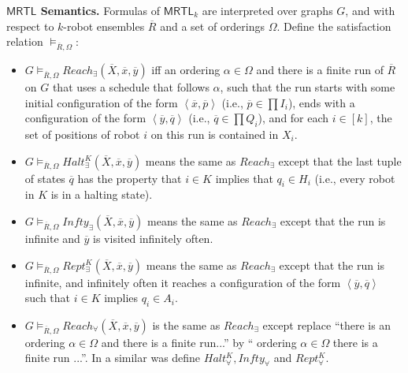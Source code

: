 \documentclass{llncs}
\def\MRTL{\textsf{MRTL}}
\newcommand{\tup}[1]{\overline{#1}}
\newcommand{\tpl}[1]{\left<{#1}\right>}
\newcommand{\sr}[1]{\footnote{{\color{red} Note. #1}}}
\renewcommand{\sr}[1]{}
\begin{document}
{\bf $\MRTL$ Semantics.} Formulas of $\MRTL_k$ are interpreted over graphs $G$, and with respect to $k$-robot ensembles $\tup{R}$ and a set of orderings $\Omega$.
Define the satisfaction relation $\models_{\tup{R},\Omega}$:
\begin{itemize}
\item $G \models_{\tup{R},\Omega} Reach_\exists(\tup{X},\tup{x},\tup{y})$ iff  an ordering $\alpha \in \Omega$ and there is a finite run of $\tup{R}$ on $G$ that uses a schedule that follows $\alpha$, such that the run starts with some initial configuration of the form $\tpl{\tup{x},\tup{p}}$ (i.e., $\tup{p} \in \prod I_i$), ends with a configuration of the form $\tpl{\tup{y},\tup{q}}$ (i.e., $\tup{q} \in \prod Q_i$), and for each $i \in [k]$, the set of positions of robot $i$ on this run is contained in $X_i$.

\item $G \models_{\tup{R},\Omega}Halt^K_\exists(\tup{X},\tup{x},\tup{y})$ means the same as $Reach_\exists$ except that the last tuple of states $\tup{q}$ has the property that $i \in K$ implies that $q_i \in H_i$ (i.e., every robot in $K$ is in a halting state).

\item $G \models_{\tup{R},\Omega}Infty_\exists(\tup{X},\tup{x},\tup{y})$ means the same as $Reach_\exists$ except that the run is infinite and $\tup{y}$ is visited infinitely often.

\item $G \models_{\tup{R},\Omega}Rept^K_\exists(\tup{X},\tup{x},\tup{y})$ means the same as $Reach_\exists$ except that the run is infinite, and infinitely often it reaches a configuration of the form $\tpl{\tup{y},\tup{q}}$ such that $i \in K$ implies $q_i \in A_i$.\sr{note that this means that every robot in $K$ is infinitely often, and simultaneously, in an accepting state. what natural task can be expressed using this atom?}

\item $G \models_{\tup{R},\Omega}Reach_\forall(\tup{X},\tup{x},\tup{y})$ is the same as $Reach_\exists$ except replace ``there is an ordering $\alpha \in \Omega$ and there is a finite run...'' by `` ordering $\alpha \in \Omega$ {there is} a finite run ...''. In a similar was define $Halt^K_\forall, Infty_\forall$ and $Rept^K_\forall$.
\end{itemize}
\end{document}
